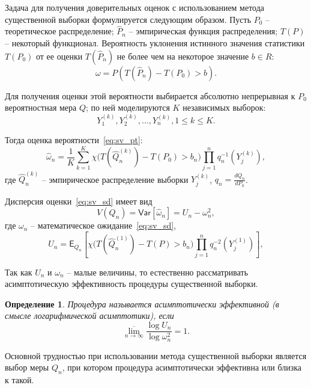 \documentclass[12pt, specialist, subf, substylefile = spbu.rtx]{disser}
\newtheorem{definition}{Определение}
\newcommand{\Expect}{\mathsf{E}}
\newcommand{\Var}{\mathsf{Var}}
\begin{document}
Задача для получения доверительных оценок с использованием метода существенной выборки формулируется следующим образом. Пусть $P_0$ -- теоретическое распределение; $\hat{P}_n$ -- эмпирическая функция распределения; $T(P)$ -- некоторый функционал. Вероятность уклонения истинного значения статистики $T(P_0)$ от ее оценки $T(\hat{P}_n)$ не более чем на некоторое значение $b \in R$:
\begin{equation}\label{eq:sv_pt}
\omega=P(T(\hat{P}_n)-T(P_0) > b).
\end{equation}

Для получения оценки этой вероятности выбирается абсолютно непрерывная к $P_0$ вероятностная мера $Q$; по ней моделируются $K$ независимых выборок:
$$
Y_1^{(k)}, Y_2^{(k)}, ... , Y_n^{(k)}, 1 \le k \le K.
$$

Тогда оценка вероятности~\eqref{eq:sv_pt}:
\begin{equation}\label{eq:sv_sd}
\hat{\omega}_n=\frac{1}{K} \sum\limits_{k=1}^{K}
\chi \big(T(\hat{Q}^{(k)}_n)-T(P_0) > b_n\big)
\prod\limits_{j=1}^{n} q_n^{-1}(Y_j^{(k)}),
\end{equation}
где $\hat{Q}^{(k)}_n$ -- эмпирическое распределение выборки $Y^{(k)}_j$, $q_n=\frac{dQ_n}{dP_0}$.

Дисперсия оценки~\eqref{eq:sv_sd} имеет вид
\begin{equation}\label{eq:est_disp}
V(Q_n)=\Var[\hat\omega_n]=U_n-\omega_n^2,
\end{equation}
где $\omega_n$ -- математическое ожидание~\eqref{eq:sv_sd},
$$
U_n=\Expect_{Q_n} 
\left[   
\chi \big(T(\hat{Q}^{(1)}_n)-T(P) > b_n\big)
\prod\limits_{j=1}^{n} q_n^{-2}(Y_j^{(1)})
\right],
$$

Так как $U_n$ и $\omega_n$ -- малые величины, то естественно рассматривать асимптотическую эффективность процедуры существенной выборки. 

\begin{definition}
Процедура называется асимптотически эффективной (в смысле логарифмической асимптотики), если 
$$
\overline{\lim\limits_{n \to \infty}} \frac{\log U_n}{\log \omega_n^2} = 1.
$$
\end{definition}

Основной трудностью при использовании метода существенной выборки является выбор меры $Q_n$, при котором процедура асимптотически эффективна или близка к такой.
\end{document}
